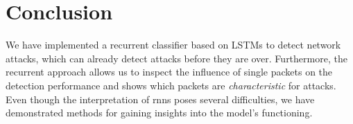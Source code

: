 \documentclass[conference]{IEEEtran}
\newcommand\note[2]{{\color{#1}#2}}
\newcommand\todo[1]{{\note{red}{TODO: #1}}}
\begin{document}


\section{Conclusion}

We have implemented a recurrent classifier based on LSTMs to detect network attacks, %
which can already detect attacks before they are over. Furthermore, the recurrent approach allows us to inspect the influence of single packets on the detection performance and shows which packets are \textit{characteristic} for attacks.
Even though the interpretation of \glspl{rnn} poses several difficulties, we have demonstrated methods for gaining insights into the model's functioning.
\end{document}
